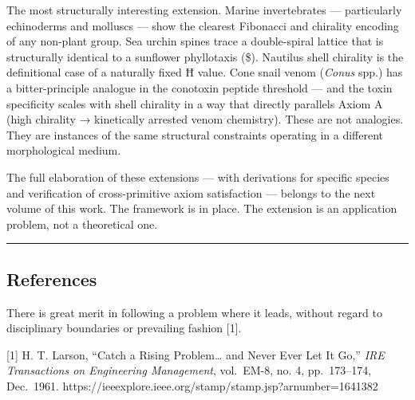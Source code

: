 \documentclass[12pt,a4paper]{article}
\begin{document}
The most structurally interesting extension. Marine invertebrates ---
particularly echinoderms and molluscs --- show the clearest Fibonacci
and chirality encoding of any non-plant group. Sea urchin spines trace a
double-spiral lattice that is structurally identical to a sunflower
phyllotaxis (\Omega\$). Nautilus shell chirality is the definitional
case of a naturally fixed Ħ value. Cone snail venom (\emph{Conus} spp.)
has a bitter-principle analogue in the conotoxin peptide threshold ---
and the toxin specificity scales with shell chirality in a way that
directly parallels Axiom A (high chirality → kinetically arrested venom
chemistry). These are not analogies. They are instances of the same
structural constraints operating in a different morphological medium.

The full elaboration of these extensions --- with derivations for
specific species and verification of cross-primitive axiom satisfaction
--- belongs to the next volume of this work. The framework is in place.
The extension is an application problem, not a theoretical one.

\begin{center}\rule{0.5\linewidth}{0.5pt}\end{center}

\hypertarget{references}{%
\subsection{References}\label{references}}

There is great merit in following a problem where it leads, without
regard to disciplinary boundaries or prevailing fashion {[}1{]}.

{[}1{]} H. T. Larson, ``Catch a Rising Problem\ldots{} and Never Ever
Let It Go,'' \emph{IRE Transactions on Engineering Management},
vol.~EM-8, no. 4, pp.~173--174, Dec.~1961.
https://ieeexplore.ieee.org/stamp/stamp.jsp?arnumber=1641382
\end{document}

